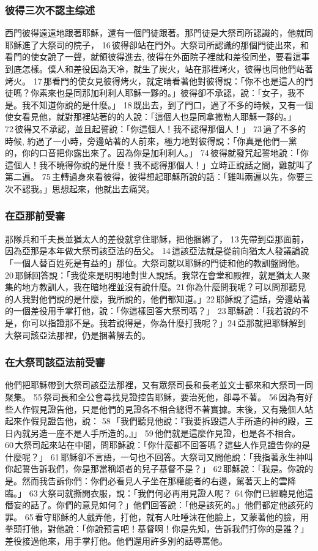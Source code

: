 \subsubsection{彼得三次不認主综述}
西門彼得遠遠地跟著耶穌，還有一個門徒跟著。那門徒是大祭司所認識的，他就同耶穌進了大祭司的院子， 16 彼得卻站在門外。大祭司所認識的那個門徒出來，和看門的使女說了一聲，就領彼得進去,  彼得在外面院子裡就和差役同坐，要看這事到底怎樣。僕人和差役因為天冷，就生了炭火，站在那裡烤火，彼得也同他們站著烤火。 17 那看門的使女見彼得烤火，就定睛看著他對彼得說：「你不也是這人的門徒嗎？你素來也是同那加利利人耶穌一夥的。」彼得卻不承認，說：「女子，我不是。我不知道你說的是什麼。」 18 既出去，到了門口，過了不多的時候，又有一個使女看見他，就對那裡站著的的人說：「這個人也是同拿撒勒人耶穌一夥的。」 72 彼得又不承認，並且起誓說：「你這個人！我不認得那個人！」 73 過了不多的時候, 約過了一小時，旁邊站著的人前來，極力地對彼得說：「你真是他們一黨的，你的口音把你露出來了。因為你是加利利人。」 74 彼得就發咒起誓地說：「你這個人！我不曉得你說的是什麼！我不認得那個人！」立時正說話之間，雞就叫了第二遍。 75 主轉過身來看彼得，彼得想起耶穌所說的話：「雞叫兩遍以先，你要三次不認我。」思想起來，他就出去痛哭。

\subsubsection{在亞那前受審}
那隊兵和千夫長並猶太人的差役就拿住耶穌，把他捆綁了， 13 先帶到亞那面前，因為亞那是本年做大祭司該亞法的岳父。 14 這該亞法就是從前向猶太人發議論說「一個人替百姓死是有益的」那位。大祭司就以耶穌的門徒和他的教訓盤問他。 20 耶穌回答說：「我從來是明明地對世人說話。我常在會堂和殿裡，就是猶太人聚集的地方教訓人，我在暗地裡並沒有說什麼。21 你為什麼問我呢？可以問那聽見的人我對他們說的是什麼，我所說的，他們都知道。」22 耶穌說了這話，旁邊站著的一個差役用手掌打他，說：「你這樣回答大祭司嗎？」 23 耶穌說：「我若說的不是，你可以指證那不是。我若說得是，你為什麼打我呢？」24 亞那就把耶穌解到大祭司該亞法那裡，仍是捆著解去的。

\subsubsection{在大祭司該亞法前受審}
他們把耶穌帶到大祭司該亞法那裡，又有眾祭司長和長老並文士都來和大祭司一同聚集。  55 祭司長和全公會尋找見證控告耶穌，要治死他，卻尋不著。 56 因為有好些人作假見證告他，只是他們的見證各不相合總得不著實據。末後，又有幾個人站起來作假見證告他，說： 58 「我們聽見他說：『我要拆毀這人手所造的神的殿，三日內就另造一座不是人手所造的。』」 59 他們就是這麼作見證，也是各不相合。 60 大祭司起來站在中間，問耶穌說：「你什麼都不回答嗎？這些人作見證告你的是什麼呢？」 61 耶穌卻不言語，一句也不回答。大祭司又問他說：「我指著永生神叫你起誓告訴我們，你是那當稱頌者的兒子基督不是？」 62 耶穌說：「我是。你說的是。然而我告訴你們：你們必看見人子坐在那權能者的右邊，駕著天上的雲降臨。」 63 大祭司就撕開衣服，說：「我們何必再用見證人呢？ 64 你們已經聽見他這僭妄的話了。你們的意見如何？」他們回答說：「他是該死的。」他們都定他該死的罪。 65 看守耶穌的人戲弄他，打他，就有人吐唾沫在他臉上，又蒙著他的臉，用拳頭打他，對他說：「你說預言吧！基督啊！你是先知，告訴我們打你的是誰？」差役接過他來，用手掌打他。他們還用許多別的話辱罵他。

